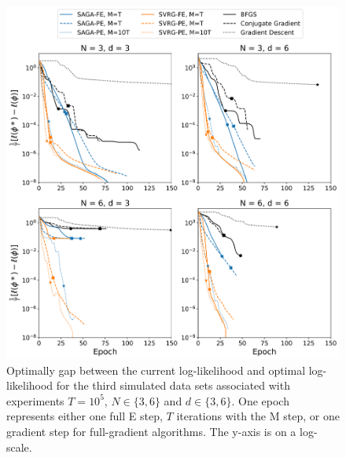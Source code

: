 \documentclass[12pt]{article}
\begin{document}
\begin{figure}[H]
    \centering
    \includegraphics[width=6.5in]{../plt/log-like_v_epoch_T-100000-002.png}
    \caption{Optimally gap between the current log-likelihood and optimal log-likelihood for the third simulated data sets associated with experiments $T=10^{5}$, $N \in \{3,6\}$ and $d \in \{3,6\}$. One epoch represents either one full E step, $T$ iterations with the M step, or one gradient step for full-gradient algorithms. The y-axis is on a log-scale.}
\end{figure}
%
\end{document}
